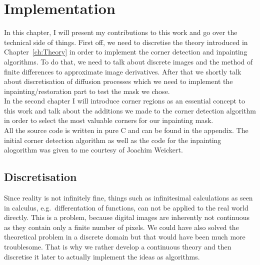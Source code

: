 \chapter{Implementation}\label{ch:Implementation} 
In this chapter, I will present my contributions to this work and go over the technical side of
things. First off, we need to discretise the theory introduced in Chapter~\ref{ch:Theory} in order
to implement the corner detection and inpainting algorithms. To do that, we need to talk about
discrete images and the method of finite differences to approximate image derivatives.
After that we shortly talk about discretisation of diffusion processes which we need to implement
the inpainting/restoration part to test the mask we chose.\\  
In the second chapter I will introduce corner regions as an essential concept to this work and talk
about the additions we made to the corner detection algorithm in order to select the most valuable
corners for our inpainting mask.\\
All the source code is written in pure C and can be found in the appendix.
The initial corner detection algorithm as well as the code for the inpainting alogorithm was given
to me courtesy of Joachim Weickert.

\section{Discretisation}\label{sec:Discretisation}

Since reality is not infinitely fine, things such as infinitesimal calculations as seen in 
calculus, e.g.\ differentation of functions, can not be applied to the real world directly.
This is a problem, because digital images are inherently not continuous as they contain only a
finite number of pixels. 
We could have also solved the theoretical problem in a discrete domain but that would have 
been much more troublesome.
That is why we rather develop a continuous theory and then discretise it later to actually
implement the ideas as algorithms.

